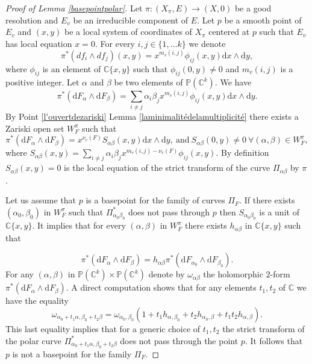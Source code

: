 \documentclass[reqno,dvipsnames,12pt]{amsart}
\begin{document}
\begin{proof}[Proof of Lemma \ref{basepointpolar}]
Let $\pi:(X_{\pi},E)\longrightarrow(X,0)$ be a good resolution and  $E_v$ be an irreducible component of $E$. Let $p$ be a smooth  point of $E_v$ and $(x,y)$ be a local system of coordinates of $X_{\pi}$ centered at $p$ such that $E_v$ has  local  equation $x=0$. For every $i,j \in \{1,\dots k\}$ we denote  $$\pi^*(df_i \wedge df_j)(x,y)=x^{m_v(i,j)}\phi_{ij}(x,y)\mathrm{d}x \wedge \mathrm{d}y,$$ where $\phi_{ij}$ is an element of $\mathbb{C}\{x,y\}$ such that $\phi_{ij}(0,y) \neq 0$ and $m_v(i,j)$ is a positive integer. Let $\alpha$ and  $\beta$ be two elements of $\mathbb{P}(\mathbb{C}^k)$. We  have 
 $$ \pi^*(\mathrm{d}F_{\alpha} \wedge \mathrm{d}F_{\beta}) =\sum_{i\neq j} \alpha_i \beta_j x^{m_v(i,j)}\phi_{ij}(x,y)\mathrm{d}x\wedge \mathrm{d}y. $$
 By Point \ref{l'ouvertdezariski} Lemma \ref{laminimalitédelamultiplicité} there exists a Zariski open set $W_{F}^{\pi}$ such that  $$\pi^{*}(\mathrm{d}F_{\alpha} \wedge \mathrm{d}F_{\beta})=x^{\nu_v(F) }S_{\alpha \beta}(x,y)\mathrm{d}x \wedge \mathrm{d}y, \ \text{and} \ S_{\alpha \beta}(0,y) \neq 0 \ \forall (\alpha,\beta) \in W_{F}^{\pi},$$	 
where $S_{\alpha \beta}(x,y)=\sum_{i\neq j} \alpha_i \beta_j x^{m_v(i,j)-\nu_v(F)}\phi_{ij}(x,y)$.  By definition  $S_{\alpha \beta}(x,y)=0$ is the local equation of the strict transform of the curve $\Pi_{\alpha \beta}$ by $\pi$. 

Let us assume that $p$ is a basepoint for the family of curves $\Pi_F$. If there exists $(\alpha_0,\beta_0)$ in $ W_{F}^{\pi}$  such that $\Pi_{\alpha_0\beta_0}^*$ does not pass through $p$ then $S_{\alpha_0\beta_0}$ is a unit of $\mathbb{C}\{x,y\}$. It implies that for every $(\alpha,\beta)$ in $ W_{F}^{\pi}$ there exists $h_{\alpha \beta}$ in $\mathbb{C}\{x,y\}$ such that

 $$\pi^{*}(\mathrm{d}F_{\alpha} \wedge \mathrm{d}F_{\beta})=h_{\alpha \beta} \pi^{*}(\mathrm{d}F_{\alpha_0} \wedge \mathrm{d}F_{\beta_0}).$$ For any $(\alpha,\beta)$  in $\mathbb{P}(\mathbb{C}^k) \times \mathbb{P}(\mathbb{C}^k)$ denote by $\omega_{\alpha\beta}$ the holomorphic $2$-form $\pi^{*}(\mathrm{d}F_{\alpha} \wedge \mathrm{d}F_{\beta})$. A direct computation  shows that for any elements $t_1,t_2$  of $\mathbb{C}$ we have the equality $$\omega_{\alpha_0+t_1 \alpha,\beta_0+t_2 \beta}=\omega_{\alpha_{0},\beta_{0}}(1+t_1h_{\alpha,\beta_0}+t_2h_{\alpha_0,\beta}+t_1t_2h_{\alpha,\beta}). $$ This last equality implies that for a generic choice of $t_1, t_2$ the  strict transform of the polar curve $\Pi_{\alpha_0+t_1 \alpha,\beta_0+t_2 \beta}^*$ does not pass through the point $p$. It follows that $p$ is not a basepoint for the family $\Pi_F$. 
 

\end{proof}
\end{document}

